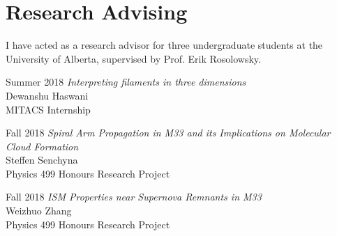 \documentclass[letterpaper,11pt]{article}
\newlength{\mainindent} \setlength{\mainindent}{12pt}
\newlength{\contentindent} \setlength{\contentindent}{19ex}
\newenvironment{datelist}{
  \begingroup
  \raggedright
  \begin{description}[labelindent=\mainindent,leftmargin=\contentindent,
      style=sameline,font=\normalfont,topsep=0pt,partopsep=0pt,parsep=0pt,
      itemsep=4pt]
}{
  \end{description}
  \endgroup
}
\begin{document}
\section*{Research Advising}

I have acted as a research advisor for three undergraduate students at the University of Alberta, supervised by Prof. Erik Rosolowsky.
\vspace{0.1in}
\begin{datelist}
\item[Summer 2018]
  \emph{Interpreting filaments in three dimensions} \\
  Dewanshu Haswani \\
  MITACS Internship
\item[Fall 2018]
  \emph{Spiral Arm Propagation in M33 and its Implications on Molecular Cloud Formation} \\
  Steffen Senchyna \\
  Physics 499 Honours Research Project
\item[Fall 2018]
  \emph{ISM Properties near Supernova Remnants in M33} \\
  Weizhuo Zhang \\
  Physics 499 Honours Research Project
\end{datelist}




\end{document}
